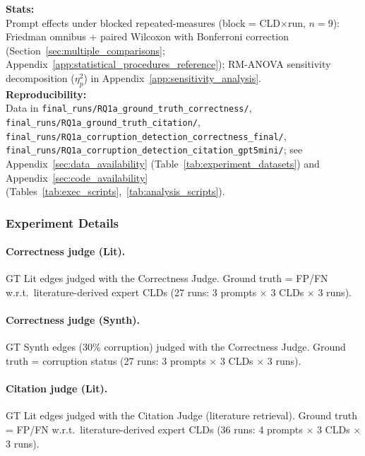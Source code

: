 \textbf{Stats:}\\
Prompt effects under blocked repeated-measures (block = CLD$\times$run, $n{=}9$): Friedman omnibus + paired Wilcoxon with Bonferroni correction (Section~\ref{sec:multiple_comparisons}; Appendix~\ref{app:statistical_procedures_reference}); RM-ANOVA sensitivity decomposition ($\eta^2_p$) in Appendix~\ref{app:sensitivity_analysis}.\\
\textbf{Reproducibility:}\\
Data in \texttt{final\_runs/RQ1a\_ground\_truth\_correctness/}, \texttt{final\_runs/RQ1a\_ground\_truth\_citation/}, \texttt{final\_runs/RQ1a\_corruption\_detection\_correctness\_final/}, \texttt{final\_runs/RQ1a\_corruption\_detection\_citation\_gpt5mini/}; see Appendix~\ref{sec:data_availability} (Table~\ref{tab:experiment_datasets}) and Appendix~\ref{sec:code_availability} (Tables~\ref{tab:exec_scripts},~\ref{tab:analysis_scripts}).

\subsubsection{Experiment Details}

\paragraph{Correctness judge (Lit).}\label{sec:rq1a_correctness_lit}
GT Lit edges judged with the Correctness Judge. Ground truth = FP/FN w.r.t.\ literature-derived expert CLDs (27 runs: 3 prompts $\times$ 3 CLDs $\times$ 3 runs).

\paragraph{Correctness judge (Synth).}\label{sec:rq1a_correctness_synth}
GT Synth edges (30\% corruption) judged with the Correctness Judge. Ground truth = corruption status (27 runs: 3 prompts $\times$ 3 CLDs $\times$ 3 runs).

\paragraph{Citation judge (Lit).}\label{sec:rq1a_citation_lit}
GT Lit edges judged with the Citation Judge (literature retrieval). Ground truth = FP/FN w.r.t.\ literature-derived expert CLDs (36 runs: 4 prompts $\times$ 3 CLDs $\times$ 3 runs).

